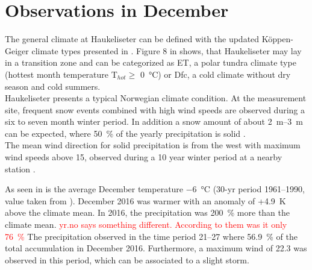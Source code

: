\section{Observations in December}
The general climate at Haukeliseter can be defined with the updated K\"oppen-Geiger climate types presented in \cite{peel_updated_2007}. Figure 8 in \cite{peel_updated_2007} shows, that Haukeliseter may lay in a transition zone and can be categorized as  ET, a polar tundra climate type (hottest month temperature T$_{hot}\ge$ \SI{0}{\celsius}) or Dfc, a cold climate without dry season and cold summers. 
\\
Haukeliseter presents a typical Norwegian climate condition. At the measurement site, frequent snow events combined with high wind speeds are observed during a six to seven month winter period. In addition a snow amount of about \SIrange{2}{3}{\m} can be expected, where \SI{50}{\percent} of the yearly precipitation is solid \citep{wolff_new_2010, wolff_measurements_2013, wolff_derivation_2015}. \\
The mean wind direction for solid precipitation is from the west with maximum wind speeds above \SI{15}{\mPs}, observed during a 10 year winter period at a nearby station \citep{wolff_new_2010, wolff_derivation_2015}. 

\noindent As seen in  is the average December temperature \SI{-6}{\celsius} (30-yr period \numrange{1961}{1990}, value taken from \cite{eklima_norwegian_2016}).
December 2016 was warmer with an anomaly of +\SI{4.9}{\kelvin} above the climate mean. 
In 2016, the precipitation was \SI{200}{\percent} more than the climate mean. \textcolor{red}{yr.no says something different. According to them was it only \SI{76}{\percent}} 
The precipitation observed in the time period \SIrange{21}{27}{\dec} where \SI{56.9}{\percent} of the total accumulation in December 2016. Furthermore, a maximum wind of \SI{22.3}{\mPs} was observed in this period, which can be associated to a slight storm.